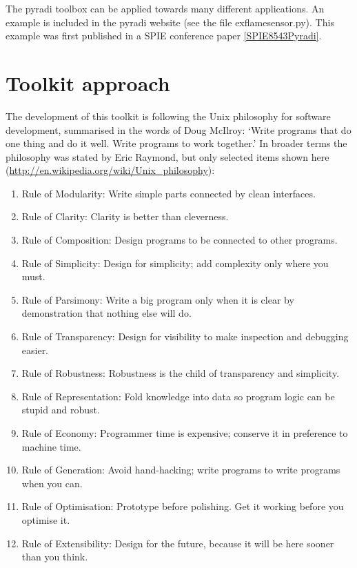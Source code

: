 \documentclass[a4paper,10pt,english]{sphinxmanual}
\begin{document}
The pyradi toolbox can be applied towards many different applications. An example
is included in the pyradi website (see the file exflamesensor.py). This example
was first published in a SPIE conference paper {\hyperref[introduction:spie8543pyradi]{{[}SPIE8543Pyradi{]}}}.


\section{Toolkit approach}
\label{introduction:toolkit-approach}
The development of this toolkit is following the Unix philosophy for software
development, summarised in the words of Doug McIlroy: `Write programs that do
one thing and do it well. Write programs to work together.' In broader terms the
philosophy was stated by Eric Raymond, but only selected items shown here
(\href{http://en.wikipedia.org/wiki/Unix\_philosophy}{http://en.wikipedia.org/wiki/Unix\_philosophy}):
\begin{enumerate}
\item {} 
Rule of Modularity: Write simple parts connected by clean interfaces.

\item {} 
Rule of Clarity: Clarity is better than cleverness.

\item {} 
Rule of Composition: Design programs to be connected to other programs.

\item {} 
Rule of Simplicity: Design for simplicity; add complexity only where you must.

\item {} 
Rule of Parsimony: Write a big program only when it is clear by demonstration
that nothing else will do.

\item {} 
Rule of Transparency: Design for visibility to make inspection and
debugging easier.

\item {} 
Rule of Robustness: Robustness is the child of transparency and simplicity.

\item {} 
Rule of Representation: Fold knowledge into data so program logic can
be stupid and robust.

\item {} 
Rule of Economy: Programmer time is expensive; conserve it in preference
to machine time.

\item {} 
Rule of Generation: Avoid hand-hacking; write programs to write programs
when you can.

\item {} 
Rule of Optimisation: Prototype before polishing. Get it working before
you optimise it.

\item {} 
Rule of Extensibility: Design for the future, because it will be here sooner
than you think.

\end{enumerate}
\end{document}
